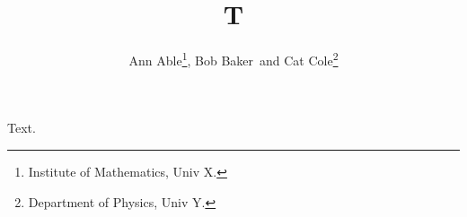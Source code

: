 \documentclass{article}
\begin{document}
\title{T}
\author{Ann Able\footnote{Institute of Mathematics, Univ X.}, Bob Baker\footnotemark[1] $\,$ and Cat Cole\footnote{Department of Physics, Univ Y.}}
\maketitle
Text.
\end{document}
